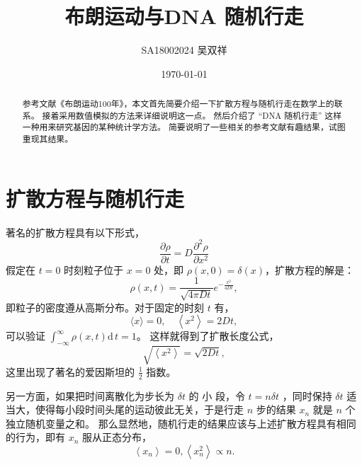 \documentclass[
reprint,
amsmath,
amssymb,
aps,
prl
]{revtex4-1}
\begin{document}
\title{布朗运动与DNA 随机行走}
  \author{SA18002024  吴双祥}
  \date{\today}

  \begin{abstract}
    参考文献《布朗运动100年》，本文首先简要介绍一下扩散方程与随机行走在数学上的联系。
    接着采用数值模拟的方法来详细说明这一点。
    然后介绍了 “DNA 随机行走” 这样一种用来研究基因的某种统计学方法。
    简要说明了一些相关的参考文献有趣结果，试图重现其结果。
  \end{abstract}

  \maketitle

  \section{扩散方程与随机行走}%
  \label{sec:bu_lang_yun_dong_yu_sui_ji_xing_zou_}
  著名的扩散方程具有以下形式，
  \begin{equation} \label{eq:diffusion_eq}
  \frac{\partial \rho}{\partial t}=D \frac{\partial^{2} \rho}{\partial x^{2}}
  \end{equation}
 假定在 $t =0$ 时刻粒子位于 $x =0$ 处，即
 $\rho(x , 0) = \delta ( x )$，扩散方程的解是：
 \begin{equation} \label{eq:rho_xt}
  \rho(x, t)=\frac{1}{\sqrt{4 \pi D t}} e^{-\frac{x^{2}}{4 D t}},
 \end{equation}
 即粒子的密度遵从高斯分布。对于固定的时刻 $t$ 有，
 \begin{equation}\label{eq:x_mean_and_variance}
 \langle x\rangle= 0, \quad\left\langle x^{2}\right\rangle= 2 D t,
 \end{equation}
 可以验证 $\displaystyle{\int_{-\infty}^{\infty}\rho(x,t) \mathrm{d}\,t=1}$。
 这样就得到了扩散长度公式，
 \begin{equation} \label{eq:standard_deviation}
 \sqrt{\left\langle x^{2}\right\rangle}=\sqrt{2 D t},
 \end{equation}
 这里出现了著名的爱因斯坦的 $\frac{1} {2}$ 指数。
 
 另一方面，如果把时间离散化为步长为 $\delta t$ 的 小 段，令 $t = n \delta t$ ，同时保持 $\delta t$ 适当大，使得每小段时间头尾的运动彼此无关，于是行走 $n$ 步的结果 $x_n$ 就是 $n$ 个独立随机变量之和。
 那么显然地，随机行走的结果应该与上述扩散方程具有相同的行为，即有 $x_n$ 服从正态分布， 
\begin{equation} \label{eq:x_random_mean_variance}
	\left\langle x_{n}\right\rangle= 0,\left\langle x_{n}^{2}\right\rangle \propto n.
\end{equation}
 
\end{document}
